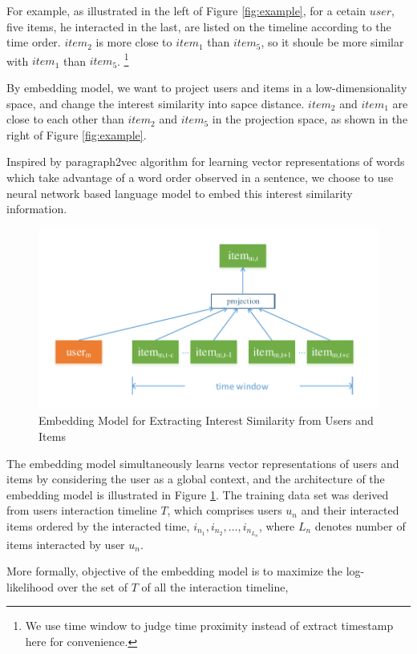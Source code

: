 \documentclass{sig-alternate-05-2015}
\begin{document}
For example, as illustrated in the left of Figure \ref{fig:example},
for a cetain $user$, five items, he interacted in the last,
are listed on the timeline according to the time order.
$item_2$ is more close to $item_1$ than $item_5$,
so it shoule be more similar with $item_1$ than $item_5$.
\footnote{We use time window to judge time proximity instead of extract timestamp here for convenience.}

By embedding model, we want to project users and items in a low-dimensionality space,
and change the interest similarity into sapce distance.
$item_2$ and $item_1$ are close to each other than $item_2$ and $item_5$
in the projection space, as shown in the right of Figure \ref{fig:example}.

Inspired by paragraph2vec algorithm \cite{le2014distributed} for learning vector representations of words
which take advantage of a word order observed in a sentence,
we choose to use neural network based language model
to embed this interest similarity information.

\begin{figure}[htbp]
	\centering
	\includegraphics[scale=0.55]{images/2.pdf}
	\caption{Embedding Model for Extracting Interest Similarity from Users and Items}
	\label{fig:embedding}
\end{figure}

The embedding model simultaneously learns vector representations of users and items
by considering the user as a global context,
and the architecture of the embedding model is illustrated in Figure \ref{fig:embedding}.
The training data set was derived from users interaction timeline $T$,
which comprises users $u_n$ and their interacted items
ordered by the interacted time,
$i_{n_1}, i_{n_2}, ..., i_{n_{L_n}}$,
where $L_n$ denotes number of items interacted by user $u_n$.

More formally, objective of the embedding model is to
maximize the log-likelihood over the set of $T$ of all the interaction timeline,
\end{document}
